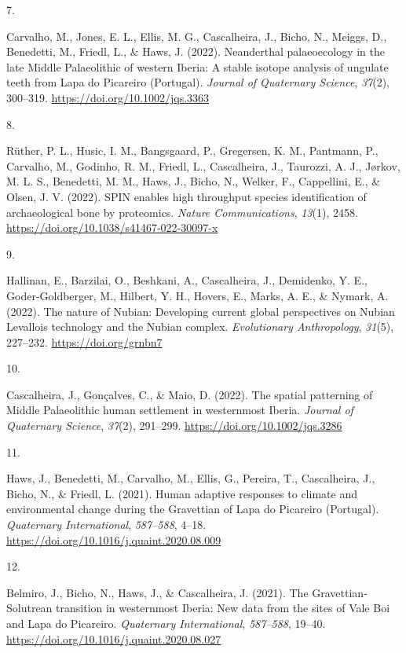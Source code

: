 \documentclass[11pt,a4paper,]{awesome-cv}
\newlength{\cslhangindent}
\newlength{\csllabelwidth}
\newenvironment{CSLReferences}[2] %
 {\begin{list}{}{%
  \setlength{\itemindent}{0pt}
  \setlength{\leftmargin}{0pt}
  \setlength{\parsep}{0pt}
  \ifodd #1
   \setlength{\leftmargin}{\cslhangindent}
   \setlength{\itemindent}{-1\cslhangindent}
  \fi
  \setlength{\itemsep}{#2\baselineskip}}}
 {\end{list}}
\newcommand{\CSLLeftMargin}[1]{\parbox[t]{\csllabelwidth}{\strut#1\strut}}
\newcommand{\CSLRightInline}[1]{\parbox[t]{\linewidth - \csllabelwidth}{\strut#1\strut}}
\begin{document}
\begin{CSLReferences}{0}{0}
\CSLLeftMargin{7. }%
\CSLRightInline{Carvalho, M., Jones, E. L., Ellis, M. G., Cascalheira,
J., Bicho, N., Meiggs, D., Benedetti, M., Friedl, L., \& Haws, J.
(2022). Neanderthal palaeoecology in the late Middle Palaeolithic of
western Iberia: A stable isotope analysis of ungulate teeth from Lapa do
Picareiro (Portugal). \emph{Journal of Quaternary Science},
\emph{37}(2), 300--319. \url{https://doi.org/10.1002/jqs.3363}}

\CSLLeftMargin{8. }%
\CSLRightInline{Rüther, P. L., Husic, I. M., Bangsgaard, P., Gregersen,
K. M., Pantmann, P., Carvalho, M., Godinho, R. M., Friedl, L.,
Cascalheira, J., Taurozzi, A. J., Jørkov, M. L. S., Benedetti, M. M.,
Haws, J., Bicho, N., Welker, F., Cappellini, E., \& Olsen, J. V. (2022).
SPIN enables high throughput species identification of archaeological
bone by proteomics. \emph{Nature Communications}, \emph{13}(1), 2458.
\url{https://doi.org/10.1038/s41467-022-30097-x}}

\CSLLeftMargin{9. }%
\CSLRightInline{Hallinan, E., Barzilai, O., Beshkani, A., Cascalheira,
J., Demidenko, Y. E., Goder‐Goldberger, M., Hilbert, Y. H., Hovers, E.,
Marks, A. E., \& Nymark, A. (2022). The nature of Nubian: Developing
current global perspectives on Nubian Levallois technology and the
Nubian complex. \emph{Evolutionary Anthropology}, \emph{31}(5),
227--232. \url{https://doi.org/grnbn7}}

\CSLLeftMargin{10. }%
\CSLRightInline{Cascalheira, J., Gonçalves, C., \& Maio, D. (2022). The
spatial patterning of Middle Palaeolithic human settlement in
westernmost Iberia. \emph{Journal of Quaternary Science}, \emph{37}(2),
291--299. \url{https://doi.org/10.1002/jqs.3286}}

\CSLLeftMargin{11. }%
\CSLRightInline{Haws, J., Benedetti, M., Carvalho, M., Ellis, G.,
Pereira, T., Cascalheira, J., Bicho, N., \& Friedl, L. (2021). Human
adaptive responses to climate and environmental change during the
Gravettian of Lapa do Picareiro (Portugal). \emph{Quaternary
International}, \emph{587--588}, 4--18.
\url{https://doi.org/10.1016/j.quaint.2020.08.009}}

\CSLLeftMargin{12. }%
\CSLRightInline{Belmiro, J., Bicho, N., Haws, J., \& Cascalheira, J.
(2021). The Gravettian-Solutrean transition in westernmost Iberia: New
data from the sites of Vale Boi and Lapa do Picareiro. \emph{Quaternary
International}, \emph{587--588}, 19--40.
\url{https://doi.org/10.1016/j.quaint.2020.08.027}}


\end{CSLReferences}
\end{document}

